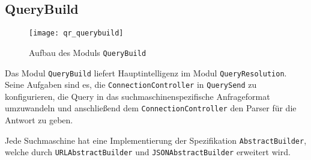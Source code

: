 
\subsection{QueryBuild}

\begin{figure}[htb]
	\centering
  	\texttt{[image: qr\_querybuild]}
  	\caption{Aufbau des Moduls \lstinline|QueryBuild|}
\end{figure}

Das Modul \lstinline|QueryBuild| liefert Hauptintelligenz im Modul \lstinline|QueryResolution|. Seine Aufgaben sind es, die \lstinline|ConnectionController| in \lstinline|QuerySend| zu konfigurieren, die Query in das suchmaschinenspezifische Anfrageformat umzuwandeln und anschließend dem \lstinline|ConnectionController| den Parser für die Antwort zu geben.

Jede Suchmaschine hat eine Implementierung der Spezifikation \lstinline|AbstractBuilder|, welche durch \lstinline|URLAbstractBuilder| und \lstinline|JSONAbstractBuilder| erweitert wird.

